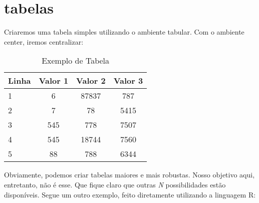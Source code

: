 %
%

\chapter{tabelas}
\label{cap:tabelas}


Criaremos uma tabela simples utilizando o ambiente tabular. Com o ambiente center, iremos centralizar:



\begin{table}[h!]
	\centering
	\caption{Exemplo de Tabela}
	\begin{tabular}{l c c c} 
	    \hline
		Linha 	& Valor 1 	& Valor 2 	& Valor 3 \\ \hline 
		1 		& 6 		& 87837 	& 787 \\ 
		2		& 7			& 78 		& 5415 \\
		3 		& 545 		& 778		& 7507 \\
		4 		& 545 		& 18744 	& 7560 \\
		5 		& 88 		& 788 		& 6344 \\
		\hline
	\end{tabular}
	\label{table:1} %
\end{table}

Obviamente, podemos criar tabelas maiores e mais robustas. Nosso objetivo aqui, entretanto, não é esse. Que fique claro que outras \textit{N} possibilidades estão disponíveis. Segue um outro exemplo, feito diretamente utilizando a linguagem R:


